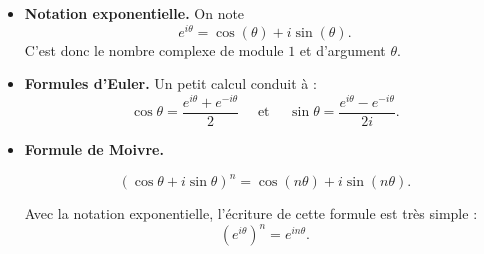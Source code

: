 \documentclass[11pt,class=report,crop=false]{standalone}
\begin{document}
\begin{cours}
\sauteligne
\begin{itemize}
  \item \textbf{Notation exponentielle.}
  On note 
  $$e^{i\theta} = \cos(\theta) + i \sin(\theta).$$
  C'est donc le nombre complexe de module $1$ et d'argument $\theta$. 
  
  
  \item \textbf{Formules d'Euler.} Un petit calcul conduit à :
$$ \cos \theta = \frac{e^{i  \theta} + e^{- i  \theta}}{2} \quad \text{ et } \quad
   \sin \theta = \frac{e^{i  \theta} - e^{- i  \theta}}{2 i }.$$

  \item \textbf{Formule de Moivre.}
  
  $$\left( \cos \theta + i \sin \theta \right)^n = \cos \left( n \theta \right)
  + i  \sin \left( n \theta \right).$$
  
  Avec la notation exponentielle, l'écriture de cette formule est très simple :
  $$\left(e^{i\theta}\right)^n = e^{i n \theta}.$$
  
\end{itemize}
\end{cours}

\end{document}
